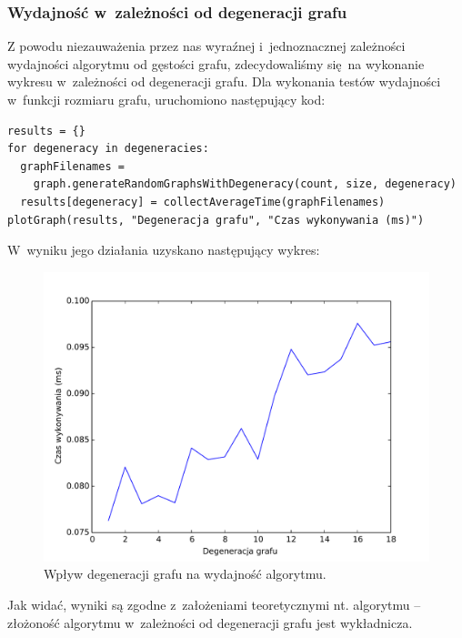 \documentclass[11pt,a4paper]{article}
\begin{document}
\newpage
\subsubsection{Wydajność w~zależności od degeneracji grafu}
Z powodu niezauważenia przez nas wyraźnej i~jednoznacznej zależności wydajności algorytmu od gęstości grafu, zdecydowaliśmy się na wykonanie wykresu w~zależności od degeneracji grafu. Dla wykonania testów wydajności w~funkcji rozmiaru grafu, uruchomiono następujący kod:\\

\begin{lstlisting}[caption = Testy wydajności w~zależności od degeneracji grafu]
results = {}
for degeneracy in degeneracies:
  graphFilenames =
    graph.generateRandomGraphsWithDegeneracy(count, size, degeneracy)
  results[degeneracy] = collectAverageTime(graphFilenames)
plotGraph(results, "Degeneracja grafu", "Czas wykonywania (ms)")
\end{lstlisting}

W~wyniku jego działania uzyskano następujący wykres:

\begin{figure}[H]
  \includegraphics[trim = 0mm 2mm 0mm 12mm, clip, width=14cm]{img/degeneracy.pdf}
  \caption{Wpływ degeneracji grafu na wydajność algorytmu.}
\end{figure}

Jak widać, wyniki są zgodne z~założeniami teoretycznymi nt. algorytmu -- złożoność algorytmu w~zależności od degeneracji grafu jest wykładnicza.
\end{document}
